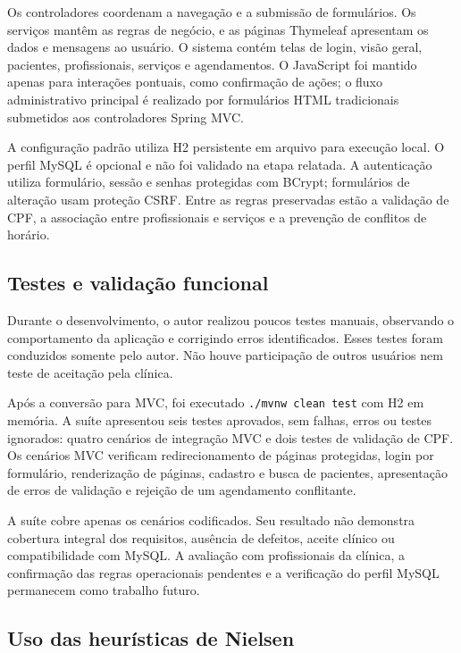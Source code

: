 \documentclass[12pt,a4paper]{article}
\begin{document}
Os controladores coordenam a navegação e a submissão de formulários. Os serviços mantêm as regras de negócio, e as páginas Thymeleaf apresentam os dados e mensagens ao usuário. O sistema contém telas de login, visão geral, pacientes, profissionais, serviços e agendamentos. O JavaScript foi mantido apenas para interações pontuais, como confirmação de ações; o fluxo administrativo principal é realizado por formulários HTML tradicionais submetidos aos controladores Spring MVC.

A configuração padrão utiliza H2 persistente em arquivo para execução local. O perfil MySQL é opcional e não foi validado na etapa relatada. A autenticação utiliza formulário, sessão e senhas protegidas com BCrypt; formulários de alteração usam proteção CSRF. Entre as regras preservadas estão a validação de CPF, a associação entre profissionais e serviços e a prevenção de conflitos de horário.

\subsection{Testes e validação funcional}

Durante o desenvolvimento, o autor realizou poucos testes manuais, observando o comportamento da aplicação e corrigindo erros identificados. Esses testes foram conduzidos somente pelo autor. Não houve participação de outros usuários nem teste de aceitação pela clínica.

Após a conversão para MVC, foi executado \texttt{./mvnw clean test} com H2 em memória. A suíte apresentou seis testes aprovados, sem falhas, erros ou testes ignorados: quatro cenários de integração MVC e dois testes de validação de CPF. Os cenários MVC verificam redirecionamento de páginas protegidas, login por formulário, renderização de páginas, cadastro e busca de pacientes, apresentação de erros de validação e rejeição de um agendamento conflitante.

A suíte cobre apenas os cenários codificados. Seu resultado não demonstra cobertura integral dos requisitos, ausência de defeitos, aceite clínico ou compatibilidade com MySQL. A avaliação com profissionais da clínica, a confirmação das regras operacionais pendentes e a verificação do perfil MySQL permanecem como trabalho futuro.

\subsection{Uso das heurísticas de Nielsen}
\end{document}
